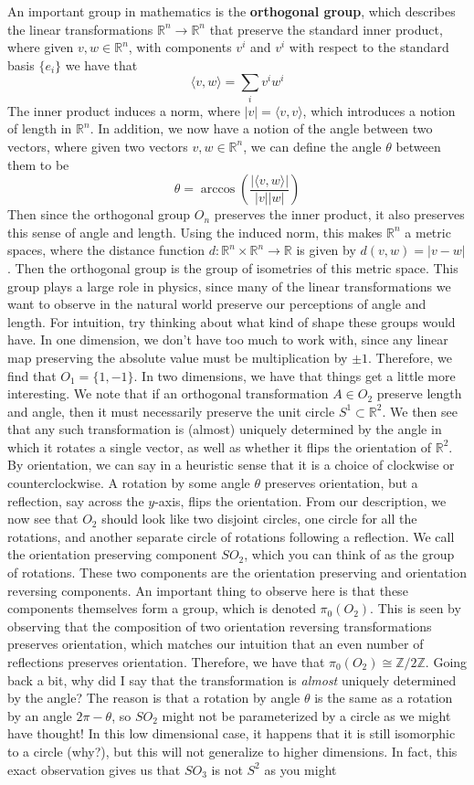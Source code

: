 \documentclass{article}
\newcommand{\R}{\mathbb{R}}
\newcommand{\Z}{\mathbb{Z}}
\begin{document}
%
An important group in mathematics is the \textbf{orthogonal group}, which describes the linear transformations $\R^n \to \R^n$ that preserve the standard inner product, where given $v,w \in \R^n$, with components $v^i$ and $v^i$ with respect to the standard basis $\{e_i\}$ we have that
$$\langle v,w \rangle  = \sum_i v^iw^i $$
The inner product induces a norm, where $|v| = \langle v,v \rangle$, which introduces a notion of length in $\R^n$. In addition, we now have a notion of the angle between two vectors, where given two vectors $v,w \in \R^n$, we can define the angle $\theta$ between them to be
$$\theta = \arccos\left( \frac{|\langle v,w \rangle|}{|v| |w|} \right) $$
Then since the orthogonal group $O_n$ preserves the inner product, it also preserves this sense of angle and length. Using the induced norm, this makes $\R^n$ a metric spaces, where the distance function $d : \R^n \times \R^n \to \R$ is given by $d(v,w) = |v - w|$. Then the orthogonal group is the group of isometries of this metric space. This group plays a large role in physics, since many of the linear transformations we want to observe in the natural world preserve our perceptions of angle and length. For intuition, try thinking about what kind of shape these groups would have. In one dimension, we don't have too much to work with, since any linear map preserving the absolute value must be multiplication by $\pm 1$. Therefore, we find that $O_1 = \{1, -1\}$. In two dimensions, we have that things get a little more interesting. We note that if an orthogonal transformation $A \in O_2$ preserve length and angle, then it must necessarily preserve the unit circle $S^1 \subset \R^2$. We then see that any such transformation is (almost) uniquely determined by the angle in which it rotates a single vector, as well as whether it flips the orientation of $\R^2$. By orientation, we can say in a heuristic sense that it is a choice of clockwise or counterclockwise. A rotation by some angle $\theta$ preserves orientation, but a reflection, say across the $y$-axis, flips the orientation. From our description, we now see that $O_2$ should look like two disjoint circles, one circle for all the rotations, and another separate circle of rotations following a reflection. We call the orientation preserving component $SO_2$, which you can think of as the group of rotations. These two components are the orientation preserving and orientation reversing components. An important thing to observe here is that these components themselves form a group, which is denoted $\pi_0(O_2)$. This is seen by observing that the composition of two orientation reversing transformations preserves orientation, which matches our intuition that an even number of reflections preserves orientation. Therefore, we have that $\pi_0(O_2) \cong \Z / 2\Z$. Going back a bit, why did I say that the transformation is \emph{almost} uniquely determined by the angle? The reason is that a rotation by angle $\theta$ is the same as a rotation by an angle $2\pi - \theta$, so $SO_2$ might not be parameterized by a circle as we might have thought! In this low dimensional case, it happens that it is still isomorphic to a circle (why?), but this will not generalize to higher dimensions. In fact, this exact observation gives us that $SO_3$ is not $S^2$ as you might 
\end{document}
